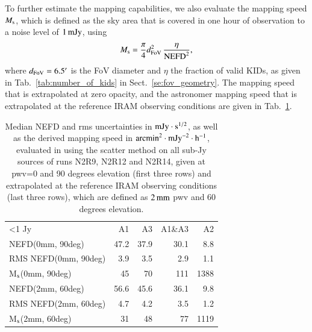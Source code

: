 To further estimate the mapping capabilities, we also evaluate the
mapping speed $M_{\rm{s}}$, which is defined as the sky area that is covered in one
hour of observation to a noise level of $1\,\rm{mJy}$, using
\begin{equation}
M_{\rm{s}} = \frac{\pi}{4} d_{\rm{FoV}}^2 \, \frac{\eta}{\rm{NEFD}^2},
\end{equation}
where $d_{\rm{FoV}} = 6.5'$ is the FoV diameter and $\eta$ the
fraction of valid KIDs, as given in Tab.~\ref{tab:number_of_kids} in
Sect.~\ref{se:fov_geometry}.
The mapping speed that is extrapolated at zero opacity, and the astronomer
mapping speed that is extrapolated at the reference IRAM observing conditions are
given in Tab.~\ref{tab:nefd_astro}.   

\begin{table}[!thbp]
  \begin{center}
    \caption[NEFD estimates on all sub-Jy sources]{Median NEFD and rms
      uncertainties in $\rm{mJy}\cdot \rm{s}^{1/2}$, as well as the derived mapping
      speed in $\rm{arcmin}^2\cdot\rm{mJy}^{-2}\cdot\rm{h}^{-1}$, evaluated
      in using the scatter method on all sub-Jy sources of runs N2R9, N2R12
      and N2R14, given at pwv=0 and 90 degrees elevation (first three rows) and extrapolated at the
      reference IRAM observing conditions (last three rows), which are defined
      as $2\,\rm{mm}$ pwv and 60 degrees elevation.}
    \label{tab:nefd_astro}
    \begin{tabular}{lrrrr}
      \hline\hline
      \noalign{\smallskip}
      <1 Jy               & A1      &   A3    &   A1\&A3 &    A2 \\
      \noalign{\smallskip}
      \hline
      \noalign{\smallskip}
      NEFD\small{(0mm, 90deg)}             & 47.2    & 37.9    &    30.1  &    8.8   \\
      RMS NEFD\small{(0mm, 90deg)}         &  3.9    &  3.5    &     2.9  &    1.1   \\
      M$_{\rm{s}}$\small{(0mm, 90deg)}      & 45      &  70     &    111   &   1388   \\
      \hline
      \noalign{\smallskip}
      NEFD\small{(2mm, 60deg)}         & 56.6    & 45.6    &    36.1  &    9.8   \\
      RMS NEFD\small{(2mm, 60deg)}     &  4.7    & 4.2     &     3.5  &    1.2   \\
      M$_{\rm{s}}$\small{(2mm, 60deg)}  &  31    & 48       &    77   &   1119   \\
      \hline
    \end{tabular}
\end{center}
\end{table}
